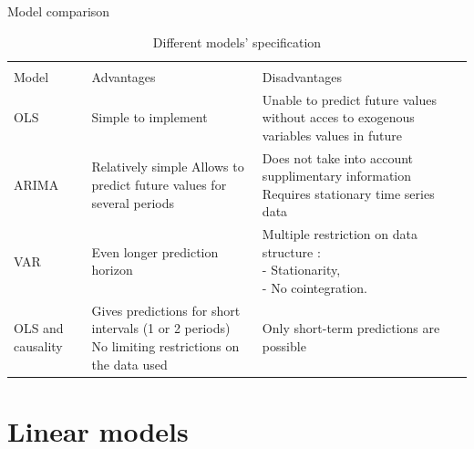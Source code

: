 \documentclass[11pt,ignorenonframetext,]{beamer}
\begin{document}
\begin{frame}{Model comparison}
\protect\hypertarget{model-comparison}{}

\tiny
\begin{table}[H]
\begin{tabular}{p{2cm} | p{4cm} | p{4cm}}
\hline \\[-1.8ex]
Model & 
    Advantages & 
        Disadvantages \\
\hline
OLS & 
    Simple to implement & 
        Unable to predict future values without acces to exogenous variables values in future \\
\hline
ARIMA & 
    Relatively simple  
    Allows to predict future values for several periods &
        \makecell{Does not take into account supplimentary information \\
        Requires stationary time series data} \\
\hline
VAR & 
    Even longer prediction horizon & 
        \makecell{Multiple restriction on data structure : \\
        - Stationarity, \\
        - No cointegration.} \\
\hline
OLS and causality & 
    \makecell{Gives predictions for short intervals (1 or 2 periods) \\
    No limiting restrictions on the data used} &
        Only short-term predictions are possible \\
\hline
\end{tabular}
\normalsize
\caption{Different models' specification}
\end{table}

\end{frame}

\hypertarget{linear-models}{%
\section{Linear models}\label{linear-models}}
\end{document}
